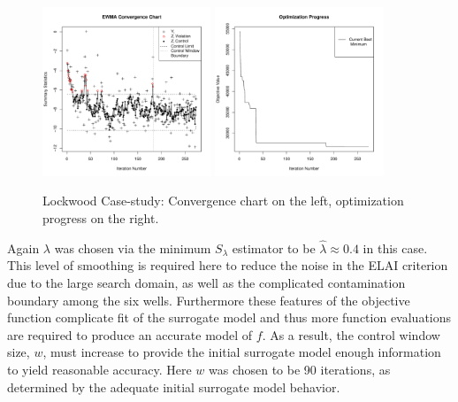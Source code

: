 \documentclass[12pt]{article}
\def \lockLamb {
        0.4
}
\begin{document}

%
\begin{figure}
        \centering
        \includegraphics[width=0.45\textwidth]{./figures/ewmaConvChartLock6Three20000End.pdf}
        \includegraphics[width=0.45\textwidth]{./figures/bestZLock6Three20000End.pdf}
        \caption{Lockwood Case-study: Convergence chart on the left, optimization progress on the right.}
        \label{lock6EWMAEnd}
\end{figure}
%
%

%
Again $\lambda$ was chosen via the minimum $S_\lambda$ estimator to be $\hat\lambda\approx\lockLamb$ in this case. 
%
This level of smoothing is required here to reduce the noise in the ELAI criterion due to the large search domain, as well as the complicated contamination boundary among the six wells.
%
Furthermore these features of the objective function complicate fit of the surrogate model and thus more function evaluations are required to produce an accurate model of $f$. %
As a result, the control window size, $w$, must increase to provide the initial surrogate model enough information to yield reasonable accuracy. 
Here $w$ was chosen to be 90 iterations, as determined by the adequate initial surrogate model behavior. %
\end{document}
